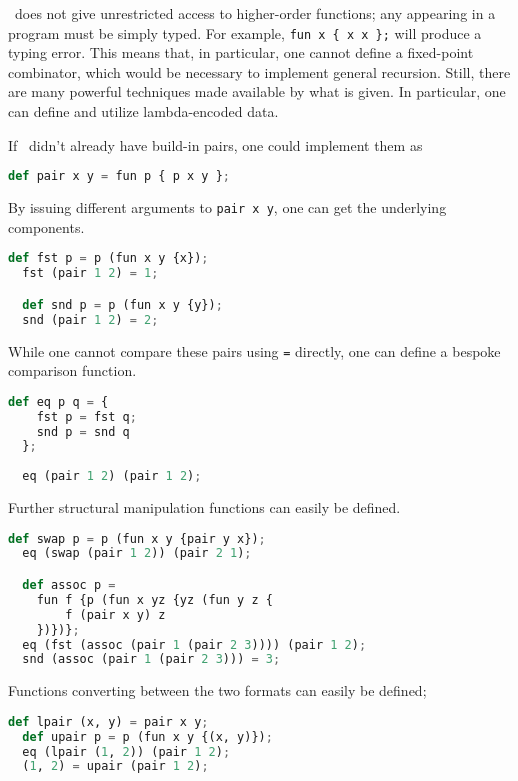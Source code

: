 \vampir\ does not give unrestricted access to higher-order functions; any appearing in a program must be simply typed. For example, \lstinline|fun x { x x };| will produce a typing error. This means that, in particular, one cannot define a fixed-point combinator, which would be necessary to implement general recursion. Still, there are many powerful techniques made available by what is given. In particular, one can define and utilize lambda-encoded data.

If \vampir\ didn't already have build-in pairs, one could implement them as

\begin{lstlisting}[language=Python]
  def pair x y = fun p { p x y };
\end{lstlisting}

By issuing different arguments to \lstinline|pair x y|, one can get the underlying components.

\begin{lstlisting}[language=Python]
  def fst p = p (fun x y {x});
  fst (pair 1 2) = 1;

  def snd p = p (fun x y {y});
  snd (pair 1 2) = 2;
\end{lstlisting}

While one cannot compare these pairs using \lstinline|=| directly, one can define a bespoke comparison function.

\begin{lstlisting}[language=Python]
  def eq p q = {
    fst p = fst q; 
    snd p = snd q
  };
  
  eq (pair 1 2) (pair 1 2);
\end{lstlisting}

Further structural manipulation functions can easily be defined.

\begin{lstlisting}[language=Python]
  def swap p = p (fun x y {pair y x});
  eq (swap (pair 1 2)) (pair 2 1);

  def assoc p = 
    fun f {p (fun x yz {yz (fun y z {
        f (pair x y) z
    })})};
  eq (fst (assoc (pair 1 (pair 2 3)))) (pair 1 2);
  snd (assoc (pair 1 (pair 2 3))) = 3;
\end{lstlisting}

Functions converting between the two formats can easily be defined;

\begin{lstlisting}[language=Python]
  def lpair (x, y) = pair x y;
  def upair p = p (fun x y {(x, y)});
  eq (lpair (1, 2)) (pair 1 2);
  (1, 2) = upair (pair 1 2);
\end{lstlisting}

